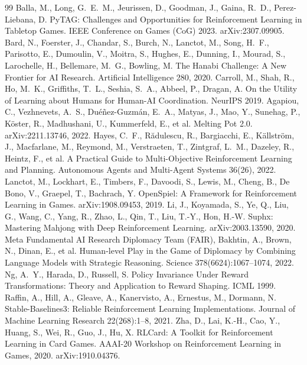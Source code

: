 \documentclass{article}
\begin{document}
\label{refsstart}
\begin{thebibliography}{99}
 Balla, M., Long, G.~E.~M., Jeurissen, D., Goodman, J., Gaina, R.~D., Perez-Liebana, D. PyTAG: Challenges and Opportunities for Reinforcement Learning in Tabletop Games. IEEE Conference on Games (CoG) 2023. arXiv:2307.09905.
 Bard, N., Foerster, J., Chandar, S., Burch, N., Lanctot, M., Song, H.~F., Parisotto, E., Dumoulin, V., Moitra, S., Hughes, E., Dunning, I., Mourad, S., Larochelle, H., Bellemare, M.~G., Bowling, M. The Hanabi Challenge: A New Frontier for AI Research. Artificial Intelligence 280, 2020.
 Carroll, M., Shah, R., Ho, M.~K., Griffiths, T.~L., Seshia, S.~A., Abbeel, P., Dragan, A. On the Utility of Learning about Humans for Human-AI Coordination. NeurIPS 2019.
 Agapiou, C., Vezhnevets, A.~S., Du\'{e}\~{n}ez-Guzm\'{a}n, E.~A., Matyas, J., Mao, Y., Sunehag, P., K\"{o}ster, R., Madhushani, U., Kummerfeld, E., et al. Melting Pot 2.0. arXiv:2211.13746, 2022.
 Hayes, C.~F., R\u{a}dulescu, R., Bargiacchi, E., K\"{a}llstr\"{o}m, J., Macfarlane, M., Reymond, M., Verstraeten, T., Zintgraf, L.~M., Dazeley, R., Heintz, F., et al. A Practical Guide to Multi-Objective Reinforcement Learning and Planning. Autonomous Agents and Multi-Agent Systems 36(26), 2022.
 Lanctot, M., Lockhart, E., Timbers, F., Davoodi, S., Lewis, M., Cheng, B., De Bono, V., Graepel, T., Bachrach, Y. OpenSpiel: A Framework for Reinforcement Learning in Games. arXiv:1908.09453, 2019.
 Li, J., Koyamada, S., Ye, Q., Liu, G., Wang, C., Yang, R., Zhao, L., Qin, T., Liu, T.-Y., Hon, H.-W. Suphx: Mastering Mahjong with Deep Reinforcement Learning. arXiv:2003.13590, 2020.
 Meta Fundamental AI Research Diplomacy Team (FAIR), Bakhtin, A., Brown, N., Dinan, E., et al. Human-level Play in the Game of Diplomacy by Combining Language Models with Strategic Reasoning. Science 378(6624):1067--1074, 2022.
 Ng, A.~Y., Harada, D., Russell, S. Policy Invariance Under Reward Transformations: Theory and Application to Reward Shaping. ICML 1999.
 Raffin, A., Hill, A., Gleave, A., Kanervisto, A., Ernestus, M., Dormann, N. Stable-Baselines3: Reliable Reinforcement Learning Implementations. Journal of Machine Learning Research 22(268):1--8, 2021.
 Zha, D., Lai, K.-H., Cao, Y., Huang, S., Wei, R., Guo, J., Hu, X. RLCard: A Toolkit for Reinforcement Learning in Card Games. AAAI-20 Workshop on Reinforcement Learning in Games, 2020. arXiv:1910.04376.

\end{thebibliography}
\end{document}
